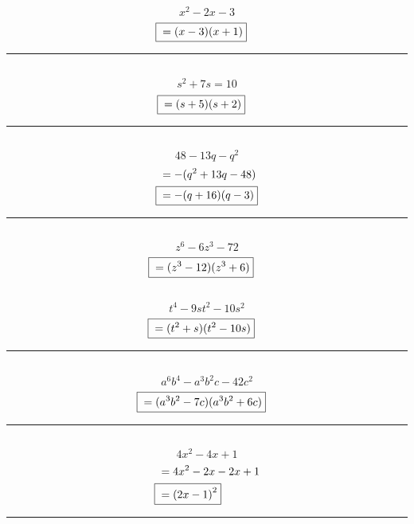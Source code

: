 	\subsection{}
		\[x^2 - 2x - 3\]
		\begin{align*}
			\Aboxed{{} &= (x - 3)(x + 1)}
		\end{align*}
		\hrule{}

	\subsection{}
		\[s^2 + 7s = 10\]
		\begin{align*}
			\Aboxed{{} &= (s + 5)(s + 2)}
		\end{align*}
		\hrule{}

	\subsection{}
		\[48 - 13q - q^2\]
		\begin{align*}
			&= -(q^2 + 13q - 48) \\
			\Aboxed{{} &= -(q + 16)(q - 3)}
		\end{align*}
		\hrule{}

	\subsection{}
		\[z^6 - 6z^3 - 72\]
		\begin{align*}
			\Aboxed{{} &= (z^3 - 12)(z^3 + 6)}
		\end{align*}

	\subsection{}
		\[t^4 - 9st^2 - 10s^2\]
		\begin{align*}
			\Aboxed{{} &= (t^2 + s)(t^2 - 10s)}
		\end{align*}
		\hrule{}

	\subsection{}
		\[a^6b^4 - a^3b^2c - 42c^2\]
		\begin{align*}
			\Aboxed{{} &= (a^3b^2 - 7c)(a^3b^2 + 6c)}
		\end{align*}
		\hrule{}

	\subsection{}
		\[4x^2 - 4x + 1\]
		\begin{align*}
			&= 4x^2 - 2x - 2x + 1 \\
			\Aboxed{{} &= {(2x - 1)}^2}
		\end{align*}
		\hrule{}

